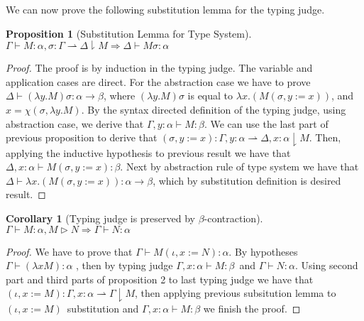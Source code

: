 \documentclass{article}
\newcommand{\upd}[3]{\ensuremath{#1, #2 {:=} #3}}
\newtheorem{prop}{Proposition}
\newtheorem{coro}{Corollary}
\newcommand{\type}[3]{\ensuremath{#1 \vdash #2 : #3}}
\newcommand{\goesd}[4]{\ensuremath{#1 : #2 \rightharpoonup #3 \downharpoonright #4}}
\newcommand{\betacontr}[2]{\ensuremath{#1 \triangleright #2}}
\begin{document}
We can now prove the following substitution lemma for the typing judge. 

\begin{prop}[Substitution Lemma for Type System]
  $\type{\Gamma}{M}{\alpha}, \goesd{\sigma}{\Gamma}{\Delta}{M} \Rightarrow \type{\Delta}{M \sigma}{\alpha}$
\end{prop}

\begin{proof}
The proof is by induction in the typing judge. The variable and application cases are direct. For the abstraction case we have to prove \type{\Delta}{(\lambda y. M) \sigma}{\alpha \rightarrow \beta}, where $(\lambda y. M) \sigma$ is equal to $\lambda x . (M (\upd{\sigma}{y}{x}))$, and $x = \chi (\sigma , \lambda y . M)$. By the syntax directed definition of the typing judge, using abstraction case, we derive that $\type{\Gamma, y : \alpha}{M}{\beta}$. We can use the last part of previous proposition to derive that $\goesd{(\upd{\sigma}{y}{x})}{\Gamma , y : \alpha}{\Delta , x : \alpha}{M}$. Then, applying the inductive hypothesis to previous result we have that $\type{\Delta, x : \alpha}{M (\upd{\sigma}{y}{x}) }{\beta}$. Next by abstraction rule of type system we have that $\type{\Delta}{ \lambda x. (M (\upd{\sigma}{y}{x})) }{\alpha \rightarrow \beta}$, which by substitution definition is desired result.
\end{proof}


\begin{coro}[Typing judge is preserved by $\beta$-contraction]
  $\type{\Gamma}{M}{\alpha}, \betacontr{M}{N} \Rightarrow \type{\Gamma}{N}{\alpha}$
\end{coro}

\begin{proof}
  We have to prove that $\type{\Gamma}{M (\upd{\iota}{x}{N})}{\alpha}$. By hypotheses $\type{\Gamma}{(\lambda x M)}{\alpha}$ , then by typing judge $\type{\Gamma,x:\alpha}{M}{\beta}$\ and $\type{\Gamma}{N}{\alpha}$. Using second part and third parts of proposition 2 to last typing judge we have that $\goesd{(\upd{\iota}{x}{M})}{\Gamma , x : \alpha}{\Gamma}{M}$, then applying previous subsitution lemma to $(\upd{\iota}{x}{M})$\ substitution and $\type{\Gamma,x:\alpha}{M}{\beta}$ we finish the proof.

\end{proof}
\end{document}

